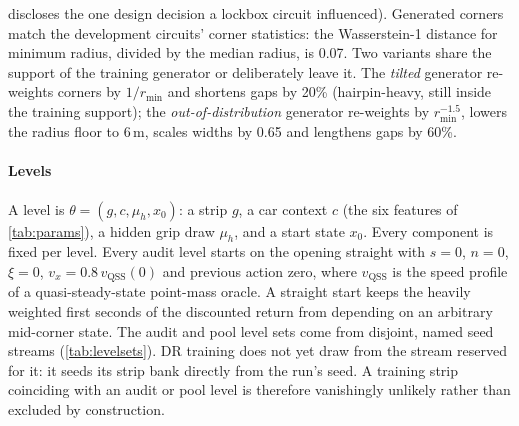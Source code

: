 discloses the one design decision a lockbox circuit influenced).
Generated corners match the development circuits' corner statistics: the
Wasserstein-1 distance for minimum radius, divided by the median radius, is 0.07.
Two variants share the support of the training generator or deliberately leave it. The
\emph{tilted} generator re-weights corners by $1/r_{\min}$ and shortens gaps by 20\%
(hairpin-heavy, still inside the training support); the \emph{out-of-distribution}
generator re-weights by $r_{\min}^{-1.5}$, lowers the radius floor to 6\,m, scales widths
by 0.65 and lengthens gaps by 60\%.

\paragraph{Levels} A level is $\theta = (g, c, \mu_h, x_0)$: a strip $g$, a car context
$c$ (the six features of \cref{tab:params}), a hidden grip draw $\mu_h$, and a start state
$x_0$. Every component is fixed per level. Every audit level starts on the opening
straight with $s = 0$, $n = 0$, $\xi = 0$, $v_x = 0.8\,v_{\text{QSS}}(0)$ and previous
action zero, where $v_{\text{QSS}}$ is the speed profile of a quasi-steady-state
point-mass oracle.
A straight start keeps the heavily weighted first seconds of the discounted return from
depending on an arbitrary mid-corner state. The audit and pool level sets come from
disjoint, named seed streams (\cref{tab:levelsets}). DR training does not yet draw from
the stream reserved for it: it seeds its strip bank directly from the run's seed. A
training strip coinciding with an audit or pool level is therefore vanishingly unlikely
rather than excluded by construction.

